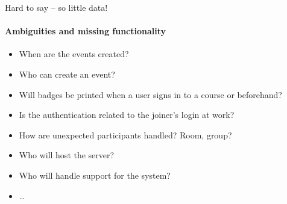\documentclass[Main]{subfiles}
\begin{document}
Hard to say -- so little data!



\paragraph{Ambiguities and missing functionality}
\begin{itemize}
\item When are the events created? 

\item Who can create an event?

\item Will badges be printed when a user signs in to a course or beforehand?

\item Is the authentication related to the joiner's login at work?

\item How are unexpected participants handled? Room, group?

\item Who will host the server?

\item Who will handle support for the system?

\item \dots
\end{itemize}
\end{document}
